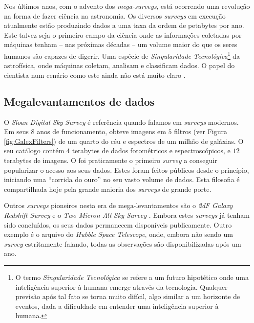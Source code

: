 Nos últimos anos, com o advento dos {\em mega-surveys}, está ocorrendo uma
revolução na forma de fazer ciência na astronomia. Os diversos {\em surveys} em
execução atualmente estão produzindo dados a uma taxa da ordem de petabytes por
ano. Este talvez seja o primeiro campo da ciência onde as informações coletadas
por máquinas tenham -- nas próximas décadas -- um volume maior do que os seres
humanos são capazes de digerir. Uma espécie de {\em Singularidade
Tecnológica}\footnote{O termo {\em Singularidade Tecnológica} se refere a um
futuro hipotético onde uma inteligência superior à humana emerge através da
tecnologia. Qualquer previsão após tal fato se torna muito difícil, algo similar
a um horizonte de eventos, dada a dificuldade em entender uma inteligência
superior à humana.} da astrofísica, onde máquinas coletam, analisam e
classificam dados. O papel do cientista num cenário como este ainda não está
muito claro \citep{Norris2010}.

\subsection{Megalevantamentos de dados}

O {\em Sloan Digital Sky Survey} \citep[\SDSS; ][]{York2000} é referência quando
falamos em {\em surveys} modernos. Em seus $8$ anos de funcionamento, obteve
imagens em $5$ filtros (ver Figura \ref{fig:GalexFilters}) de um quarto do céu e
espectros de um milhão de galáxias. O seu catálogo contém $4$ terabytes de dados
fotométricos e espectroscópicos, e $12$ terabytes de imagens. O \SDSS foi
praticamente o primeiro {\em survey} a conseguir popularizar o acesso aos seus
dados. Estes foram feitos públicos desde o princípio, iniciando uma ``corrida do
ouro'' no seu vasto volume de dados. Esta filosofia é compartilhada hoje pela
grande maioria dos {\em surveys} de grande porte.

Outros {\em surveys} pioneiros nesta era de mega-levantamentos são o
{\em 2dF Galaxy Redshift Survey} \citep[2dFGRS;][]{Colless1999} e o {\em Two
Micron All Sky Survey} \citep[2MASS;][]{Skrutskie2006}. Embora estes {\em
surveys} já tenham sido concluídos, os seus dados permanecem disponíveis
publicamente. Outro exemplo é o arquivo do {\em Hubble Space Telescope}, onde,
embora não sendo um {\em survey} estritamente falando, todas as observações são
disponibilizadas após um ano.

